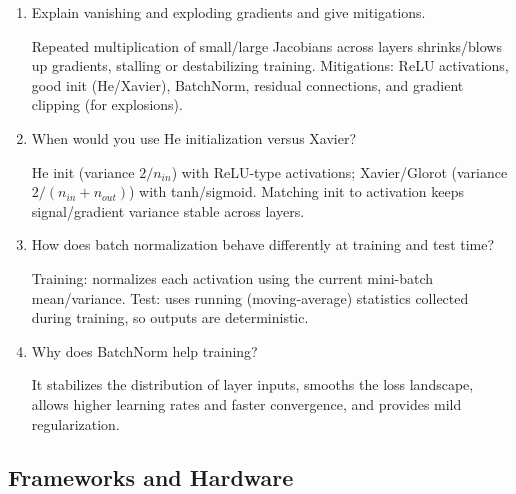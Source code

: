 \documentclass[10pt,a4paper]{article}
\newcommand{\q}[1]{\item #1}
\begin{document}
\begin{enumerate}[leftmargin=*,label=\textbf{Q\arabic*.}]

\q Explain vanishing and exploding gradients and give mitigations.
\begin{answerbox}
Repeated multiplication of small/large Jacobians across layers shrinks/blows up gradients, stalling or destabilizing training. Mitigations: ReLU activations, good init (He/Xavier), BatchNorm, residual connections, and gradient clipping (for explosions).
\end{answerbox}

\q When would you use He initialization versus Xavier?
\begin{answerbox}
He init (variance $2/n_{in}$) with ReLU-type activations; Xavier/Glorot (variance $2/(n_{in}+n_{out})$) with tanh/sigmoid. Matching init to activation keeps signal/gradient variance stable across layers.
\end{answerbox}

\q How does batch normalization behave differently at training and test time?
\begin{answerbox}
Training: normalizes each activation using the current mini-batch mean/variance. Test: uses running (moving-average) statistics collected during training, so outputs are deterministic.
\end{answerbox}

\q Why does BatchNorm help training?
\begin{answerbox}
It stabilizes the distribution of layer inputs, smooths the loss landscape, allows higher learning rates and faster convergence, and provides mild regularization.
\end{answerbox}

\end{enumerate}

\subsection{Frameworks and Hardware}
\end{document}
